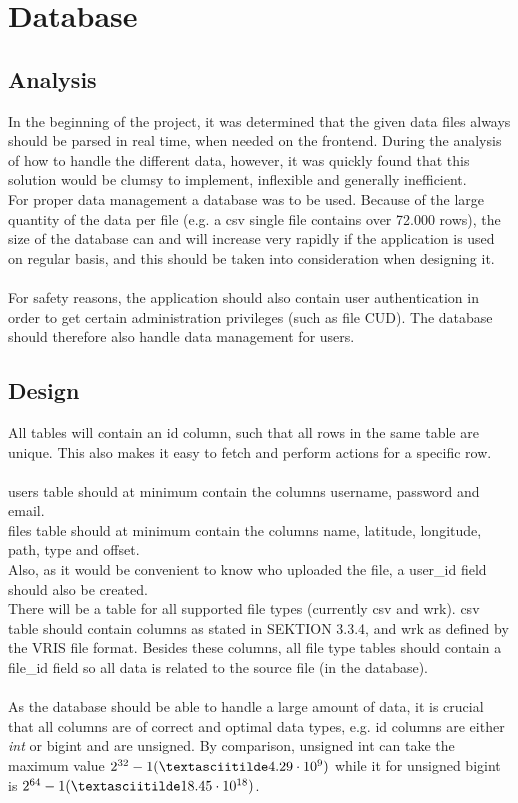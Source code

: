 \chapter{Database}

\section{Analysis}

In the beginning of the project, it was determined that the given data files always should be parsed in real time, when needed on the frontend. During the analysis of how to handle the different data, however, it was quickly found that this solution would be clumsy to implement, inflexible and generally inefficient.\\
For proper data management a database was to be used. Because of the large quantity of the data per file (e.g. a csv single file contains over 72.000 rows), the size of the database can and will increase very rapidly if the application is used on regular basis, and this should be taken into consideration when designing it.\\\\
For safety reasons, the application should also contain user authentication in order to get certain administration privileges (such as file CUD). The database should therefore also handle data management for users.\\

\section{Design}
All tables will contain an \textsf{id} column, such that all rows in the same table are unique. This also makes it easy to fetch and perform actions for a specific row.\\\\
\textsf{users} table should at minimum contain the columns \textsf{username, password} and \textsf{email}.\\
\textsf{files} table should at minimum contain the columns \textsf{name, latitude, longitude, path, type} and \textsf{offset}.\\ Also, as it would be convenient to know who uploaded the file, a \textsf{user\_id} field should also be created.\\
There will be a table for all supported file types (currently \textsf{csv} and \textsf{wrk}). \textsf{csv} table should contain columns as stated in SEKTION 3.3.4, and \textsf{wrk} as defined by the VRIS file format. Besides these columns, all file type tables should contain a \textsf{file\_id} field so all data is related to the source file (in the database).\\\\
As the database should be able to handle a large amount of data, it is crucial that all columns are of correct and optimal data types, e.g. \textsf{id} columns are either \textit{int} or \textsf{bigint} and are \textsf{unsigned}. By comparison, \textsf{unsigned int} can take the maximum value $2^{32}-1 (\textasciitilde 4.29 \cdot 10^{9})$ while it for \textsf{unsigned bigint} is $ 2^{64}-1 (\textasciitilde 18.45 \cdot 10^{18})$.

